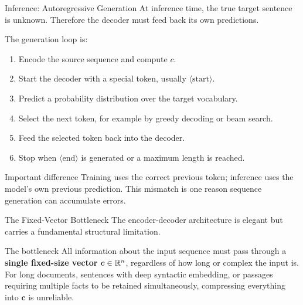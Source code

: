 \documentclass[aspectratio=169]{beamer}
\begin{document}
\begin{frame}{Inference: Autoregressive Generation}
\small
At inference time, the true target sentence is unknown. Therefore the decoder must feed back its own predictions.

\vspace{0.25cm}
The generation loop is:
\begin{enumerate}
  \item Encode the source sequence and compute $c$.
  \item Start the decoder with a special token, usually $\langle \mathrm{start} \rangle$.
  \item Predict a probability distribution over the target vocabulary.
  \item Select the next token, for example by greedy decoding or beam search.
  \item Feed the selected token back into the decoder.
  \item Stop when $\langle \mathrm{end} \rangle$ is generated or a maximum length is reached.
\end{enumerate}

\begin{alertblock}{Important difference}
Training uses the correct previous token; inference uses the model's own previous prediction. This mismatch is one reason sequence generation can accumulate errors.
\end{alertblock}
\end{frame}
%
%
\begin{frame}{The Fixed-Vector Bottleneck}
The encoder-decoder architecture is elegant but carries a fundamental structural limitation.

\vspace{0.15cm}
\begin{alertblock}{The bottleneck}
All information about the input sequence must pass through a \textbf{single fixed-size vector}
$\bm{c} \in \mathbb{R}^n$, regardless of how long or complex the input is.
For long documents, sentences with deep syntactic embedding, or passages requiring
multiple facts to be retained simultaneously, compressing everything into $\bm{c}$ is unreliable.
\end{alertblock}
\end{frame}
%
%
\end{document}
